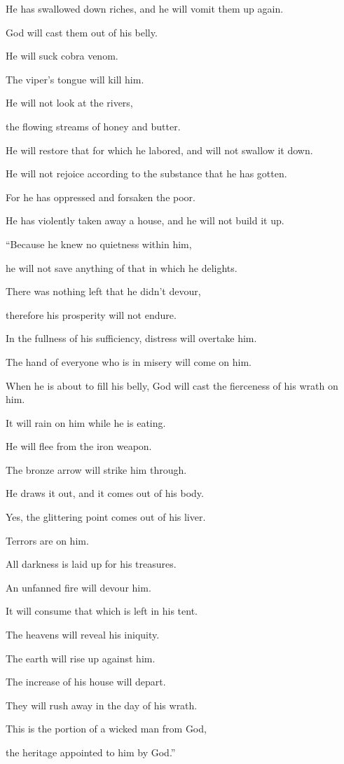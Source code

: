 {\par }{\Q {}He has swallowed down riches, and he will vomit them up again.
\par }{\QB God will cast them out of his belly.
\par }{\Q {}He will suck cobra venom.
\par }{\QB The viper’s tongue will kill him.
\par }{\Q {}He will not look at the rivers,
\par }{\QB the flowing streams of honey and butter.
\par }{\Q {}He will restore that for which he labored, and will not swallow it down.
\par }{\QB He will not rejoice according to the substance that he has gotten.
\par }{\Q {}For he has oppressed and forsaken the poor.
\par }{\QB He has violently taken away a house, and he will not build it up.
\par }{\BB \par }{\Q {}“Because he knew no quietness within him,
\par }{\QB he will not save anything of that in which he delights.
\par }{\Q {}There was nothing left that he didn’t devour,
\par }{\QB therefore his prosperity will not endure.
\par }{\Q {}In the fullness of his sufficiency, distress will overtake him.
\par }{\QB The hand of everyone who is in misery will come on him.
\par }{\Q {}When he is about to fill his belly, God will cast the fierceness of his wrath on him.
\par }{\QB It will rain on him while he is eating.
\par }{\Q {}He will flee from the iron weapon.
\par }{\QB The bronze arrow will strike him through.
\par }{\Q {}He draws it out, and it comes out of his body.
\par }{\QB Yes, the glittering point comes out of his liver.
\par }{\QB Terrors are on him.
\par }{\Q {}All darkness is laid up for his treasures.
\par }{\QB An unfanned fire will devour him.
\par }{\QB It will consume that which is left in his tent.
\par }{\Q {}The heavens will reveal his iniquity.
\par }{\QB The earth will rise up against him.
\par }{\Q {}The increase of his house will depart.
\par }{\QB They will rush away in the day of his wrath.
\par }{\Q {}This is the portion of a wicked man from God,
\par }{\QB the heritage appointed to him by God.”

}

